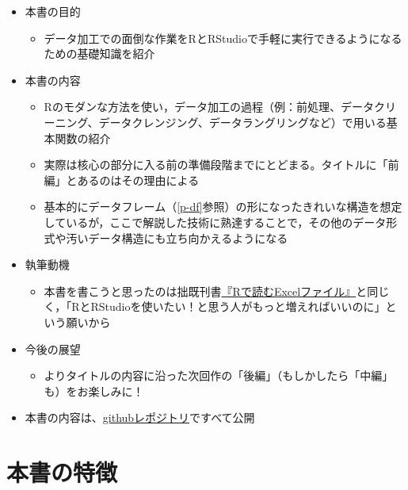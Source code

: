 \documentclass[
  xelatex,ja=standard, b5paper]{bxjsbook}
\providecommand{\tightlist}{%
  \setlength{\itemsep}{0pt}\setlength{\parskip}{0pt}}
\begin{document}
\begin{itemize}
\tightlist
\item
  本書の目的

  \begin{itemize}
  \tightlist
  \item
    データ加工での面倒な作業をRとRStudioで手軽に実行できるようになるための基礎知識を紹介
  \end{itemize}
\item
  本書の内容

  \begin{itemize}
  \tightlist
  \item
    Rのモダンな方法を使い，データ加工の過程（例：前処理、データクリーニング、データクレンジング、データラングリングなど）で用いる基本関数の紹介
  \item
    実際は核心の部分に入る前の準備段階までにとどまる。タイトルに「前編」とあるのはその理由による
  \item
    基本的にデータフレーム（\ref{p-df}参照）の形になったきれいな構造を想定しているが，ここで解説した技術に熟達することで，その他のデータ形式や汚いデータ構造にも立ち向かえるようになる
  \end{itemize}
\item
  執筆動機

  \begin{itemize}
  \tightlist
  \item
    本書を書こうと思ったのは拙既刊書\href{https://techbookfest.org/product/4794168259903488?productVariantID=5913872206659584}{『Rで読むExcelファイル』}と同じく，「RとRStudioを使いたい！と思う人がもっと増えればいいのに」という願いから
  \end{itemize}
\item
  今後の展望

  \begin{itemize}
  \tightlist
  \item
    よりタイトルの内容に沿った次回作の「後編」（もしかしたら「中編」も）をお楽しみに！
  \end{itemize}
\item
  本書の内容は、\href{https://github.com/izunyan/gisho12}{githubレポジトリ}ですべて公開
\end{itemize}

\hypertarget{ux672cux66f8ux306eux7279ux5fb4}{%
\section*{本書の特徴}\label{ux672cux66f8ux306eux7279ux5fb4}}
\end{document}
